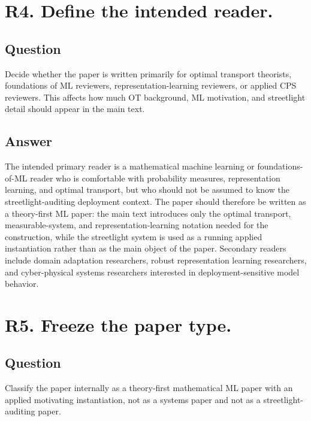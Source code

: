 \documentclass[11pt,a4paper]{article}
\begin{document}
\section*{R4. Define the intended reader.}

\subsection*{Question}

Decide whether the paper is written primarily for optimal transport theorists, foundations of ML reviewers, representation-learning reviewers, or applied CPS reviewers. This affects how much OT background, ML motivation, and streetlight detail should appear in the main text.

\subsection*{Answer}

The intended primary reader is a mathematical machine learning or foundations-of-ML reader who is comfortable with probability measures, representation learning, and optimal transport, but who should not be assumed to know the streetlight-auditing deployment context. The paper should therefore be written as a theory-first ML paper: the main text introduces only the optimal transport, measurable-system, and representation-learning notation needed for the construction, while the streetlight system is used as a running applied instantiation rather than as the main object of the paper. Secondary readers include domain adaptation researchers, robust representation learning researchers, and cyber-physical systems researchers interested in deployment-sensitive model behavior.

\section*{R5. Freeze the paper type.}

\subsection*{Question}

Classify the paper internally as a theory-first mathematical ML paper with an applied motivating instantiation, not as a systems paper and not as a streetlight-auditing paper.
\end{document}
